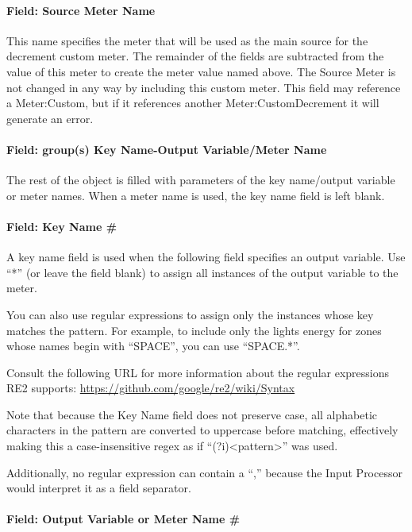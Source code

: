 \paragraph{Field: Source Meter Name}\label{field-source-meter-name}

This name specifies the meter that will be used as the main source for the decrement custom meter. The remainder of the fields are subtracted from the value of this meter to create the meter value named above. The Source Meter is not changed in any way by including this custom meter. This field may reference a Meter:Custom, but if it references another Meter:CustomDecrement it will generate an error.

\paragraph{Field: group(s) Key Name-Output Variable/Meter Name}\label{field-groups-key-name-output-variablemeter-name-1}

The rest of the object is filled with parameters of the key name/output variable or meter names. When a meter name is used, the key name field is left blank.

\paragraph{Field: Key Name \#}\label{field-key-name-1}

A key name field is used when the following field specifies an output variable.
Use ``*'' (or leave the field blank) to assign all instances of the output variable to the meter.

You can also use regular expressions to assign only the instances whose key matches the pattern.
For example, to include only the lights energy for zones whose names begin with ``SPACE'', you can use ``SPACE.*''.

Consult the following URL for more information about the regular expressions RE2 supports: \url{https://github.com/google/re2/wiki/Syntax}

Note that because the Key Name field does not preserve case, all alphabetic characters in the pattern are converted to uppercase before matching, effectively making this a case-insensitive regex as if ``(?i)<pattern>'' was used.

Additionally, no regular expression can contain a ``,'' because the Input Processor would interpret it as a field separator.

\paragraph{Field: Output Variable or Meter Name \#}\label{field-output-variable-or-meter-name-1}

